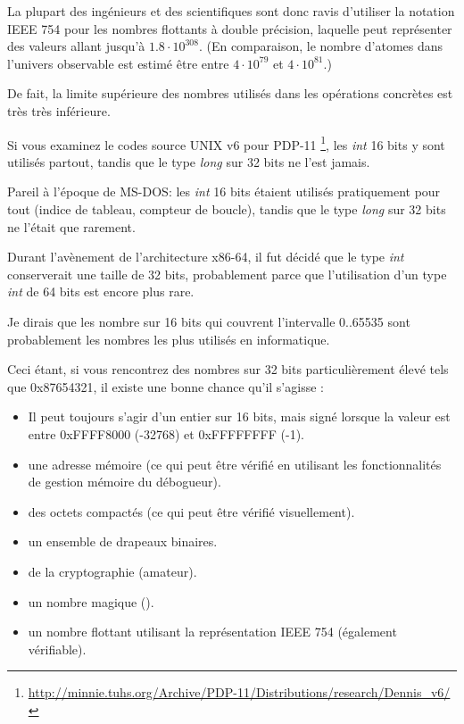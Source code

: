 La plupart des ingénieurs et des scientifiques sont donc ravis d'utiliser la notation IEEE 754 pour les
nombres flottants à double précision, laquelle peut représenter des valeurs allant jusqu'à $1.8 \cdot 10^{308}$.
(En comparaison, le nombre d'atomes dans l'univers observable est estimé être entre $4 \cdot 10^{79}$ et $4 \cdot 10^{81}$.)

De fait, la limite supérieure des nombres utilisés dans les opérations concrètes est très très inférieure.

Si vous examinez le codes source UNIX v6 pour PDP-11
\footnote{\url{http://minnie.tuhs.org/Archive/PDP-11/Distributions/research/Dennis_v6/}},
les \emph{int} 16 bits y sont utilisés partout, tandis que le type \emph{long} sur 32 bits ne l'est jamais.

Pareil à l'époque de MS-DOS: les \emph{int} 16 bits étaient utilisés pratiquement pour tout (indice de tableau, compteur de boucle),
tandis que le type \emph{long} sur 32 bits ne l'était que rarement.

Durant l'avènement de l'architecture x86-64, il fut décidé que le type \emph{int} conserverait une taille de 32 bits,
probablement parce que l'utilisation d'un type \emph{int} de 64 bits est encore plus rare.

Je dirais que les nombre sur 16 bits qui couvrent l'intervalle 0..65535 sont probablement les nombres les plus
utilisés en informatique.

Ceci étant, si vous rencontrez des nombres sur 32 bits particulièrement élevé tels que 0x87654321, il existe une
bonne chance qu'il s'agisse :

\begin{itemize}

\item Il peut toujours s'agir d'un entier sur 16 bits, mais signé lorsque la valeur est entre 0xFFFF8000 (-32768) et 0xFFFFFFFF (-1).
\item une adresse mémoire (ce qui peut être vérifié en utilisant les fonctionnalités de gestion mémoire du débogueur).
\item des octets compactés (ce qui peut être vérifié visuellement).
\item un ensemble de drapeaux binaires.
\item de la cryptographie (amateur).
\item un nombre magique ().
\item un nombre flottant utilisant la représentation IEEE 754 (également vérifiable).

\end{itemize}

